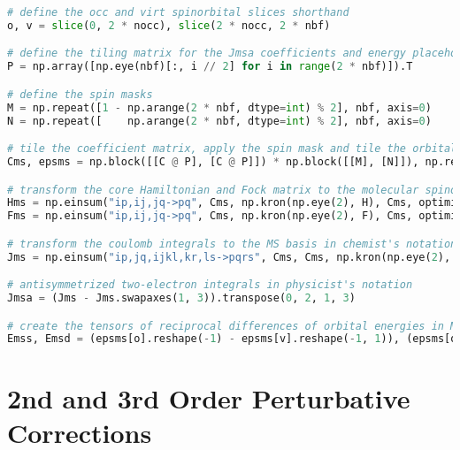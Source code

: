 \raggedbottom\begin{lstlisting}[language=Python, caption={Integral transform exercise code solution.}, label=code:int_solution]
# define the occ and virt spinorbital slices shorthand
o, v = slice(0, 2 * nocc), slice(2 * nocc, 2 * nbf)

# define the tiling matrix for the Jmsa coefficients and energy placeholders
P = np.array([np.eye(nbf)[:, i // 2] for i in range(2 * nbf)]).T

# define the spin masks
M = np.repeat([1 - np.arange(2 * nbf, dtype=int) % 2], nbf, axis=0)
N = np.repeat([    np.arange(2 * nbf, dtype=int) % 2], nbf, axis=0)

# tile the coefficient matrix, apply the spin mask and tile the orbital energies
Cms, epsms = np.block([[C @ P], [C @ P]]) * np.block([[M], [N]]), np.repeat(eps, 2)

# transform the core Hamiltonian and Fock matrix to the molecular spinorbital basis
Hms = np.einsum("ip,ij,jq->pq", Cms, np.kron(np.eye(2), H), Cms, optimize=True)
Fms = np.einsum("ip,ij,jq->pq", Cms, np.kron(np.eye(2), F), Cms, optimize=True)

# transform the coulomb integrals to the MS basis in chemist's notation
Jms = np.einsum("ip,jq,ijkl,kr,ls->pqrs", Cms, Cms, np.kron(np.eye(2), np.kron(np.eye(2), J).T), Cms, Cms, optimize=True);

# antisymmetrized two-electron integrals in physicist's notation
Jmsa = (Jms - Jms.swapaxes(1, 3)).transpose(0, 2, 1, 3)

# create the tensors of reciprocal differences of orbital energies in MS basis used in post-HF methods
Emss, Emsd = (epsms[o].reshape(-1) - epsms[v].reshape(-1, 1)), (epsms[o].reshape(-1) + epsms[o].reshape(-1, 1) - epsms[v].reshape(-1, 1, 1) - epsms[v].reshape(-1, 1, 1, 1))
\end{lstlisting}

\section{\texorpdfstring{2nd and 3rd Order Perturbative Corrections\label{sec:mp_code_solution}}{2nd and 3rd Order Perturbative Corrections}}

